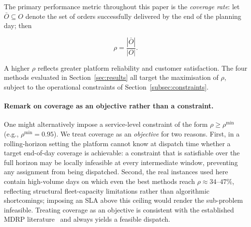 The primary performance metric throughout this paper is the
\emph{coverage rate}: let $\bar{O} \subseteq O$ denote the set
of orders successfully delivered by the end of the planning day;
then

\begin{equation}\label{eq:coverage}
    \rho = \frac{|\bar{O}|}{|O|}.
\end{equation}

\noindent
A higher $\rho$ reflects greater platform reliability and
customer satisfaction.
The four methods evaluated in Section~\ref{sec:results} all
target the maximisation of $\rho$, subject to the operational
constraints of Section~\ref{subsec:constraints}.

\paragraph{Remark on coverage as an objective rather than a constraint.}
One might alternatively impose a service-level constraint of the
form $\rho \geq \rho^{\min}$ (e.g., $\rho^{\min} = 0.95$).
We treat coverage as an \emph{objective} for two reasons.
First, in a rolling-horizon setting the platform cannot know at
dispatch time whether a target end-of-day coverage is achievable:
a constraint that is satisfiable over the full horizon may be
locally infeasible at every intermediate window, preventing any
assignment from being dispatched.
Second, the real instances used here contain high-volume days on
which even the best methods reach $\rho \approx 34$--$47\%$,
reflecting structural fleet-capacity limitations rather than
algorithmic shortcomings; imposing an SLA above this ceiling
would render the sub-problem infeasible.
Treating coverage as an objective is consistent with the
established MDRP literature~\cite{reyes2018mdrp,ulmer2021restaurant}
and always yields a feasible dispatch.
